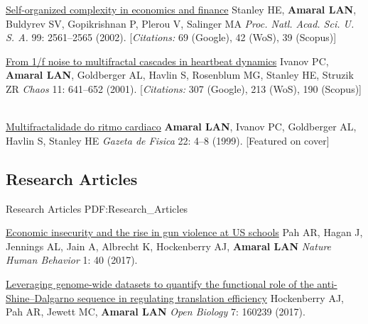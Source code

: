 \NumberedItem{\makebox[0.8cm][r]{[3]}}
\href{/people/amaral/self-organized-complexity-in-economics-and-finance}
{Self-organized complexity in economics and finance}
\newline
Stanley HE, {\textbf{Amaral LAN}}, Buldyrev SV, Gopikrishnan P, Plerou V, Salinger MA
\newline
\textit{Proc. Natl. Acad. Sci. U. S. A.}
    99:
2561--2565 (2002).
    [{\em{Citations:}} 69 (Google), 42 (WoS), 39 (Scopus)]
\newline
\Gap
~
\Gap

\NumberedItem{\makebox[0.8cm][r]{[2]}}
\href{/people/amaral/from-1f-noise-to-multifractal-cascades-in-heartbeat-dynamics}
{From 1/f noise to multifractal cascades in heartbeat dynamics}
\newline
Ivanov PC, {\textbf{Amaral LAN}}, Goldberger AL, Havlin S, Rosenblum MG, Stanley HE, Struzik ZR
\newline
\textit{Chaos}
    11:
641--652 (2001).
    [{\em{Citations:}} 307 (Google), 213 (WoS), 190 (Scopus)]
\newline
\Gap
~
\Gap

\NumberedItem{\makebox[0.8cm][r]{[1]}}
\href{False}
{Multifractalidade do ritmo cardiaco}
\newline
{\textbf{Amaral LAN}}, Ivanov PC, Goldberger AL, Havlin S, Stanley HE 
\newline
\textit{Gazeta de Fisica }
    22:
4--8  (1999).
    [Featured on cover]
\newline
\Gap
~
\Gap

\vspace*{0.2cm}\subsection
{Research Articles}
{Research Articles}
{PDF:Research_Articles}

\GapNoBreak
\NumberedItem{\makebox[0.8cm][r]{[121]}}
\href{/people/amaral/economic-insecurity-and-rise-gun-violence-us-schools}
{Economic insecurity and the rise in gun violence at US schools}
\newline
Pah AR, Hagan J, Jennings AL, Jain A, Albrecht K, Hockenberry AJ, {\textbf{Amaral LAN}}
\newline
\textit{Nature Human Behavior}
    1:
40 (2017).
\newline
\Gap
~
\Gap

\NumberedItem{\makebox[0.8cm][r]{[120]}}
\href{/people/amaral/leveraging-genome-wide-datasets-quantify-functional-role-anti-shinedalgarno-sequence-regulating-translation-efficiency}
{Leveraging genome-wide datasets to quantify the functional role of the anti-Shine–Dalgarno sequence in regulating translation efficiency}
\newline
Hockenberry AJ, Pah AR, Jewett MC, {\textbf{Amaral LAN}}
\newline
\textit{Open Biology}
    7:
160239 (2017).
\newline
\Gap
~
\Gap

